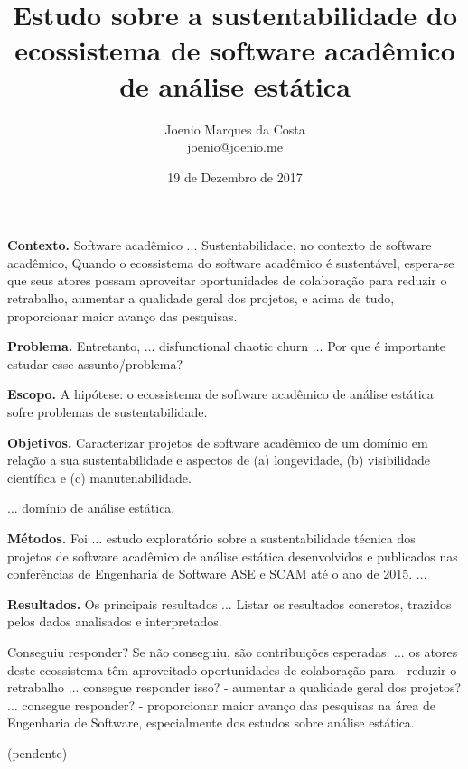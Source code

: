 \documentclass[msc, classic, a4paper]{ufbathesis}
\date{19 de Dezembro de 2017}
\title{
  Estudo sobre a sustentabilidade do ecossistema de software acadêmico de
  análise estática
}
\author{Joenio Marques da Costa\\
  {\small joenio@joenio.me}
}
\begin{document}
\frontpage
\frontmatter
\presentationpage

\resumo

\textbf{Contexto.} 
Software acadêmico ...
Sustentabilidade, no contexto de software acadêmico, 
%
Quando o ecossistema do software acadêmico é sustentável, espera-se que seus atores possam aproveitar
oportunidades de colaboração para reduzir o retrabalho, aumentar a qualidade
geral dos projetos, e acima de tudo, proporcionar maior avanço das pesquisas.

\textbf{Problema.} 
Entretanto, ... disfunctional chaotic churn ...
Por que é importante estudar esse assunto/problema?

\textbf{Escopo.} 
A hipótese: o ecossistema de software acadêmico de análise
estática sofre problemas de sustentabilidade.

\textbf{Objetivos.}
Caracterizar projetos de software acadêmico de um domínio em relação a sua sustentabilidade 
e aspectos de (a) longevidade, (b) visibilidade científica e (c) manutenabilidade.

...  domínio de análise estática.

\textbf{Métodos.}
Foi ... estudo exploratório sobre a sustentabilidade
técnica dos projetos de software acadêmico de análise estática desenvolvidos e
publicados nas conferências de Engenharia de Software ASE e SCAM até o ano de
2015.
...

\textbf{Resultados.}
Os principais resultados ...
Listar os resultados concretos, trazidos pelos dados analisados e interpretados.


Conseguiu responder? Se não conseguiu, são contribuições esperadas. 
... os atores deste ecossistema têm aproveitado oportunidades de colaboração para 
 - reduzir o retrabalho ... consegue responder isso?
- aumentar a qualidade geral dos projetos? ... consegue responder?
- proporcionar maior avanço das pesquisas na área de Engenharia de Software, 
especialmente dos estudos sobre análise estática.

\begin{keywords}

  (pendente)

\end{keywords}

\tableofcontents
\listoffigures
\listoftables

\mainmatter

\end{document}
